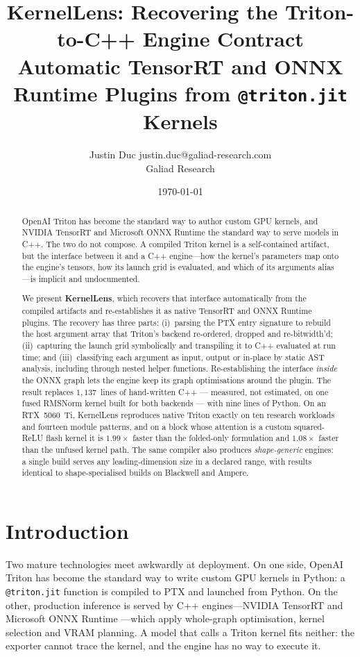 \documentclass[10pt]{article}
\title{\textbf{KernelLens: Recovering the Triton-to-C++ Engine Contract} \\
\large Automatic TensorRT and ONNX Runtime Plugins from \texttt{@triton.jit} Kernels}
\author{\name Justin Duc \email justin.duc@galiad-research.com \\
      \addr Galiad Research}
\date{\today}
\begin{document}
\maketitle

\begin{abstract}
OpenAI Triton has become the standard way to author custom GPU kernels, and
NVIDIA TensorRT and Microsoft ONNX Runtime the standard way to serve models in
C++. The two do not compose. A compiled Triton kernel is a self-contained
artifact, but the interface between it and a C++ engine---how the kernel's
parameters map onto the engine's tensors, how its launch grid is evaluated, and
which of its arguments alias---is implicit and undocumented.

We present \textbf{KernelLens}, which recovers that interface automatically from
the compiled artifacts and re-establishes it as native TensorRT and ONNX Runtime
plugins. The recovery has three parts: (i)~parsing the PTX entry signature to
rebuild the host argument array that Triton's backend re-ordered, dropped and
re-bitwidth'd; (ii)~capturing the launch grid symbolically and transpiling it to
C++ evaluated at run time; and (iii)~classifying each argument as input, output
or in-place by static AST analysis, including through nested helper functions.
Re-establishing the interface \emph{inside} the ONNX graph lets the engine keep
its graph optimisations around the plugin. The result replaces $1{,}137$~lines
of hand-written C++ --- measured, not estimated, on one fused RMSNorm kernel
built for both backends --- with nine lines of Python. On an
RTX~5060~Ti, KernelLens reproduces native Triton exactly on ten research
workloads and fourteen module patterns, and on a block whose attention is a
custom squared-ReLU flash kernel it is $1.99\times$ faster than the folded-only
formulation and $1.08\times$ faster than the unfused kernel path. The same
compiler also produces \emph{shape-generic} engines: a single build serves any
leading-dimension size in a declared range, with results identical to
shape-specialised builds on Blackwell and Ampere.
\end{abstract}

\section{Introduction}

Two mature technologies meet awkwardly at deployment. On one side, OpenAI Triton
\cite{triton2019} has become the standard way to write custom GPU kernels in
Python: a \texttt{@triton.jit} function is compiled to PTX and launched from
Python. On the other, production inference is served by C++ engines---NVIDIA
TensorRT \cite{tensorrt} and Microsoft ONNX Runtime \cite{onnxruntime}---which
apply whole-graph optimisation, kernel selection and VRAM planning. A model that
calls a Triton kernel fits neither: the exporter cannot trace the kernel, and the
engine has no way to execute it.
\end{document}
